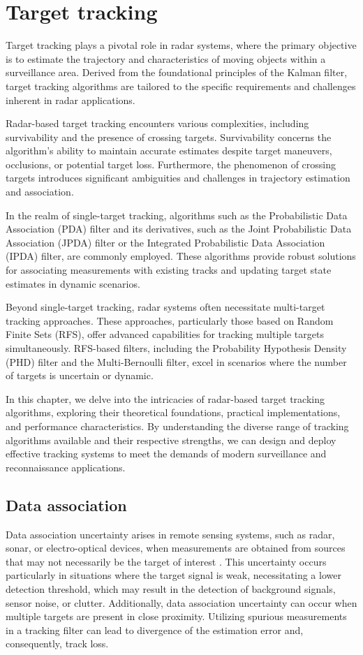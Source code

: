 
\chapter{Target tracking}
Target tracking plays a pivotal role in radar systems, where the primary objective is to estimate the trajectory and characteristics of moving objects within a surveillance area. Derived from the foundational principles of the Kalman filter, target tracking algorithms are tailored to the specific requirements and challenges inherent in radar applications.

Radar-based target tracking encounters various complexities, including survivability and the presence of crossing targets. Survivability concerns the algorithm's ability to maintain accurate estimates despite target maneuvers, occlusions, or potential target loss. Furthermore, the phenomenon of crossing targets introduces significant ambiguities and challenges in trajectory estimation and association.

In the realm of single-target tracking, algorithms such as the Probabilistic Data Association (PDA) filter and its derivatives, such as the Joint Probabilistic Data Association (JPDA) filter or the Integrated Probabilistic Data Association (IPDA) filter, are commonly employed. These algorithms provide robust solutions for associating measurements with existing tracks and updating target state estimates in dynamic scenarios.

Beyond single-target tracking, radar systems often necessitate multi-target tracking approaches. These approaches, particularly those based on Random Finite Sets (RFS), offer advanced capabilities for tracking multiple targets simultaneously. RFS-based filters, including the Probability Hypothesis Density (PHD) filter and the Multi-Bernoulli filter, excel in scenarios where the number of targets is uncertain or dynamic.

In this chapter, we delve into the intricacies of radar-based target tracking algorithms, exploring their theoretical foundations, practical implementations, and performance characteristics. By understanding the diverse range of tracking algorithms available and their respective strengths, we can design and deploy effective tracking systems to meet the demands of modern surveillance and reconnaissance applications.

\section{Data association}
\label{sec:data_association}
Data association uncertainty arises in remote sensing systems, such as radar, sonar, or electro-optical devices, when
measurements are obtained from sources that may not necessarily be the target of interest \cite{BarShalomPDA}. This uncertainty
occurs particularly in situations where the target signal is weak, necessitating a lower detection threshold, which may result in the detection of background signals, sensor noise, or clutter. Additionally, data association uncertainty can occur when multiple targets are present in close proximity. Utilizing spurious measurements in a tracking filter can lead to divergence of the estimation error and, consequently, track loss.

